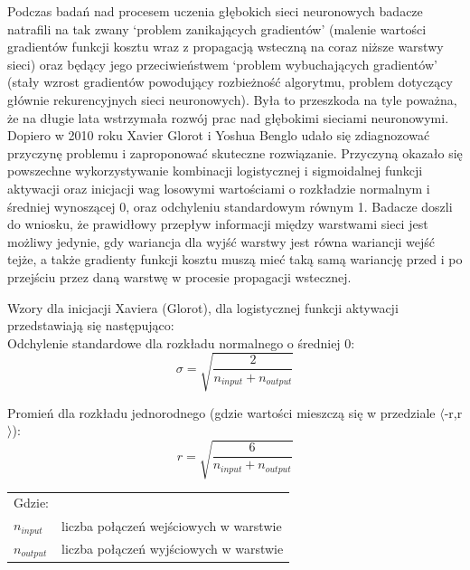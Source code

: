 \documentclass[a4paper,12pt]{article}
\numberwithin{figure}{section}
\begin{document}
    Podczas badań nad procesem uczenia głębokich sieci neuronowych badacze natrafili na tak zwany `problem zanikających gradientów' (malenie wartości gradientów funkcji kosztu wraz z propagacją wsteczną na coraz niższe warstwy sieci) oraz będący jego przeciwieństwem `problem wybuchających gradientów' (stały wzrost gradientów powodujący rozbieżność algorytmu, problem dotyczący głównie rekurencyjnych sieci neuronowych)\cite{UczenieMaszynowe2018}. Była to przeszkoda na tyle poważna, że na długie lata wstrzymała rozwój prac nad głębokimi sieciami neuronowymi. Dopiero w 2010 roku Xavier Glorot i Yoshua Benglo udało się zdiagnozować przyczynę problemu i zaproponować skuteczne rozwiązanie. Przyczyną okazało się powszechne wykorzystywanie kombinacji logistycznej i sigmoidalnej funkcji aktywacji oraz inicjacji wag losowymi wartościami o rozkładzie normalnym i średniej wynoszącej 0, oraz odchyleniu standardowym równym 1. Badacze doszli do wniosku, że prawidłowy przepływ informacji między warstwami sieci jest możliwy jedynie, gdy wariancja dla wyjść warstwy jest równa wariancji wejść tejże, a także gradienty funkcji kosztu muszą mieć taką samą wariancję przed i po przejściu przez daną warstwę w procesie propagacji wstecznej\cite{UnderstandingTheDifficultyOfTrainingDeepFeedforwardNeuralNetworks2010}.

    \bigskip

    \noindent
    \begin{minipage}[H]{\textwidth}
        \setlength\parindent{17pt} Wzory dla inicjacji Xaviera (Glorot), dla logistycznej funkcji aktywacji przedstawiają się następująco: \\
        \bigskip
        \setlength\parindent{17pt} Odchylenie standardowe dla rozkładu normalnego o średniej 0: \\
        \begin{equation}
            \label{eq:std_dev_xavier}
            \sigma = \sqrt{\frac{2}{n_{input} + n_{output}}}
        \end{equation}
    \end{minipage}

    \smallskip

    \noindent
    \begin{minipage}[H]{\textwidth}
        \setlength\parindent{17pt} Promień dla rozkładu jednorodnego (gdzie wartości mieszczą się w przedziale $\langle$-r,r$\rangle$): \\
        \begin{equation}
            \label{eq:radius_xavier}
            r = \sqrt{\frac{6}{n_{input} + n_{output}}}
        \end{equation}
        \smallskip
        \begin{tabular}{p{}p{}}
            Gdzie: \\
            $n_{input}$  & liczba połączeń wejściowych w warstwie \\
            $n_{output}$ & liczba połączeń wyjściowych w warstwie \\
        \end{tabular}
    \end{minipage}
\end{document}
